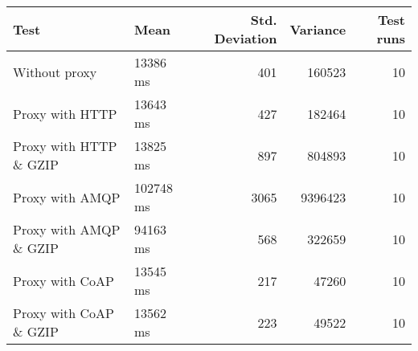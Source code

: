 \begin{tabularx}{\textwidth}{llrrr}
\hline
 Test                   & Mean      &   Std. Deviation &   Variance &   Test runs \\
\hline
 Without proxy          & 13386 ms  &              401 &     160523 &          10 \\
 Proxy with HTTP        & 13643 ms  &              427 &     182464 &          10 \\
 Proxy with HTTP \& GZIP & 13825 ms  &              897 &     804893 &          10 \\
 Proxy with AMQP        & 102748 ms &             3065 &    9396423 &          10 \\
 Proxy with AMQP \& GZIP & 94163 ms  &              568 &     322659 &          10 \\
 Proxy with CoAP        & 13545 ms  &              217 &      47260 &          10 \\
 Proxy with CoAP \& GZIP & 13562 ms  &              223 &      49522 &          10 \\
\hline
\end{tabularx}